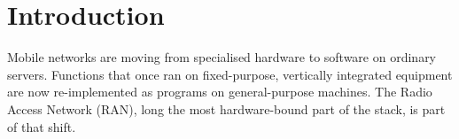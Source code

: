\documentclass[english,twoside,openright,a4paper,censored,csm,software-track-2020]{HYthesisML}
\begin{document}
{\begin{otherlanguage}{english}
\begin{abstract}
\noindent\textbf{Conclusions.}
The main cost of adopting Rust is engineering effort and the learning curve, not run-time
performance at nominal load. The gain is freedom from data races, not from concurrency
defects in general. Overload narrows that claim: a service that must degrade gracefully
depends on the standard library's synchronisation primitives, not on the safety model, and
a nominal-load test would not expose the gap.
\end{abstract}
\end{otherlanguage}
}

\cleardoublepage
{}
\setcounter{page}{1}
\tableofcontents

\cleardoublepage
{}
{}
\listoffigures

\cleardoublepage
{}
{}
\listoftables

\cleardoublepage

\mainmatter

\chapter{Introduction}

Mobile networks are moving from specialised hardware to software on ordinary servers.
Functions that once ran on fixed-purpose, vertically integrated equipment are now
re-implemented as programs on general-purpose machines. The Radio Access Network (RAN),
long the most hardware-bound part of the stack, is part of that shift.
\end{document}
